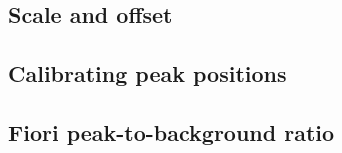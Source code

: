\subsection{Scale and offset}
\label{theory:detector_status:scaleoffset}





\subsection{Calibrating peak positions}
\label{theory:detector_status:peakpositions}






\subsection{Fiori peak-to-background ratio}
\label{theory:detector_status:fiori}

